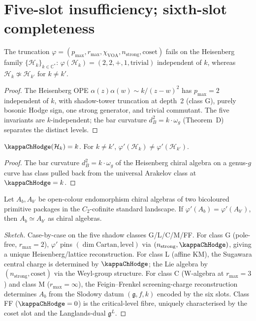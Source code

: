 \section{Five-slot insufficiency; sixth-slot completeness}
\label{sec:six-slot-completeness}

\begin{proposition}
\label{prop:five-slot-insufficient-ch}
The truncation $\varphi = (p_{\max}, r_{\max}, \chi_{\mathrm{VOA}},
n_{\mathrm{strong}}, \mathrm{coset})$ fails on the Heisenberg family
$\{\mathcal{H}_k\}_{k \in \mathbb{C}^*}$:
$\varphi(\mathcal{H}_k) = (2, 2, +, 1, \mathrm{trivial})$ independent
of $k$, whereas $\mathcal{H}_k \not\simeq \mathcal{H}_{k'}$ for
$k \ne k'$.
\end{proposition}

\begin{proof}
The Heisenberg OPE $\alpha(z) \alpha(w) \sim k / (z - w)^2$ has
$p_{\max} = 2$ independent of $k$, with shadow-tower truncation at
depth~2 (class G), purely bosonic Hodge sign, one strong generator,
and trivial commutant. The five invariants are $k$-independent; the
bar curvature $d_B^2 = k \cdot \omega_g$ (Theorem~D) separates the
distinct levels.
\end{proof}

\begin{proposition}
\label{prop:six-slot-distinguishes-ch}
$\kappaChHodge(\mathcal{H}_k) = k$. For $k \ne k'$,
$\varphi'(\mathcal{H}_k) \ne \varphi'(\mathcal{H}_{k'})$.
\end{proposition}

\begin{proof}
The bar curvature $d_B^2 = k \cdot \omega_g$ of the Heisenberg
chiral algebra on a genus-$g$ curve has class pulled back from the
universal Arakelov class at $\kappaChHodge = k$.
\end{proof}

\begin{theorem}[Completeness]
\label{thm:fingerprint-complete-ch}
Let $A_b, A_{b'}$ be open-colour endomorphism chiral algebras of two
bicoloured primitive packages in the $C_2$-cofinite standard landscape.
If $\varphi'(A_b) = \varphi'(A_{b'})$, then $A_b \simeq A_{b'}$ as
chiral algebras.
\end{theorem}

\begin{proof}[Sketch]
Case-by-case on the five shadow classes G/L/C/M/FF. For class G
(pole-free, $r_{\max} = 2$), $\varphi'$ pins $(\dim \mathrm{Cartan},
\mathrm{level})$ via $(n_{\mathrm{strong}}, \kappaChHodge)$, giving a
unique Heisenberg/lattice reconstruction. For class L (affine KM), the
Sugawara central charge is determined by $\kappaChHodge$; the Lie
algebra by $(n_{\mathrm{strong}}, \mathrm{coset})$ via the Weyl-group
structure. For class C (W-algebra at $r_{\max} = 3$) and class M
($r_{\max} = \infty$), the Feigin--Frenkel screening-charge
reconstruction determines $A_b$ from the Slodowy datum
$(\mathfrak{g}, f, k)$ encoded by the six slots. Class FF
($\kappaChHodge = 0$) is the critical-level fibre, uniquely
characterised by the coset slot and the Langlands-dual $\mathfrak{g}^L$.
\end{proof}


